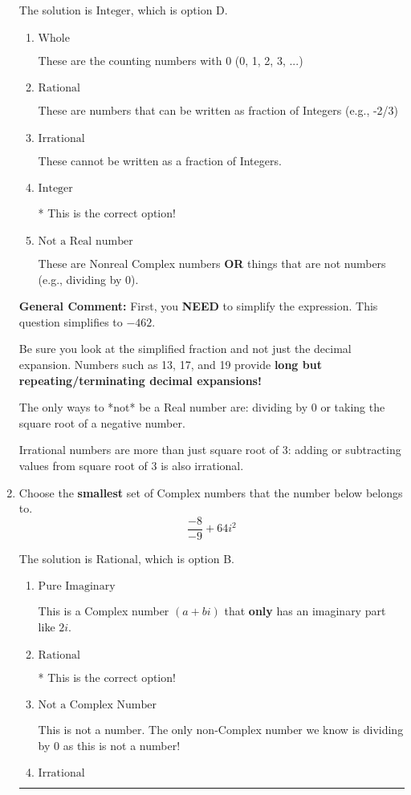 \documentclass{extbook}[14pt]
\newcommand{\litem}[1]{\item #1

\rule{\textwidth}{0.4pt}}
\begin{document}
\begin{enumerate}
{The solution is \( \text{Integer} \), which is option D.\begin{enumerate}[label=\Alph*.]
\item \( \text{Whole} \)

These are the counting numbers with 0 (0, 1, 2, 3, ...)
\item \( \text{Rational} \)

These are numbers that can be written as fraction of Integers (e.g., -2/3)
\item \( \text{Irrational} \)

These cannot be written as a fraction of Integers.
\item \( \text{Integer} \)

* This is the correct option!
\item \( \text{Not a Real number} \)

These are Nonreal Complex numbers \textbf{OR} things that are not numbers (e.g., dividing by 0).
\end{enumerate}

\textbf{General Comment:} First, you \textbf{NEED} to simplify the expression. This question simplifies to $-462$. 
 
 Be sure you look at the simplified fraction and not just the decimal expansion. Numbers such as 13, 17, and 19 provide \textbf{long but repeating/terminating decimal expansions!} 
 
 The only ways to *not* be a Real number are: dividing by 0 or taking the square root of a negative number. 
 
 Irrational numbers are more than just square root of 3: adding or subtracting values from square root of 3 is also irrational.
}
\litem{
Choose the \textbf{smallest} set of Complex numbers that the number below belongs to.
\[ \frac{-8}{-9}+64i^2 \]

The solution is \( \text{Rational} \), which is option B.\begin{enumerate}[label=\Alph*.]
\item \( \text{Pure Imaginary} \)

This is a Complex number $(a+bi)$ that \textbf{only} has an imaginary part like $2i$.
\item \( \text{Rational} \)

* This is the correct option!
\item \( \text{Not a Complex Number} \)

This is not a number. The only non-Complex number we know is dividing by 0 as this is not a number!
\item \( \text{Irrational} \)


\end{enumerate}}
\end{enumerate}
\end{document}
